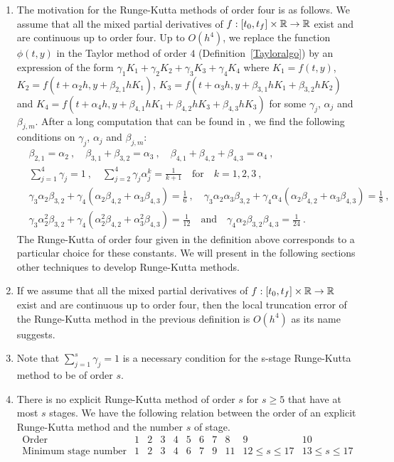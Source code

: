 \begin{rmkList}
\begin{enumerate}
\item The motivation for the Runge-Kutta methods of order four is as
follows.  We assume that all the mixed partial derivatives of
$f:[t_0,t_f]\times \mathbb{R} \rightarrow \mathbb{R}$ exist and are continuous up to
order four.  Up to $O(h^4)$, we replace the function $\phi(t,y)$ in the
Taylor method of order $4$ (Definition~\ref{Tayloralgo}) by an
expression of the form $\gamma_1 K_1 + \gamma_2 K_2 + \gamma_3 K_3 +
\gamma_4 K_4$ where
$K_1=f(t,y)$, $K_2=f(t+\alpha_2 h,y+\beta_{2,1} h K_1)$,
$K_3=f(t+\alpha_3 h,y+\beta_{3,1} h K_1 + \beta_{3,2} h K_2)$ and
$K_4=f(t+\alpha_4 h,y+\beta_{4,1} h K_1 + \beta_{4,2} h K_3 +
\beta_{4,3} h K_3)$ for some $\gamma_j$,
$\alpha_j$ and $\beta_{j,m}$.
After a long computation that can be found in \cite{La}, we find
the following conditions on $\gamma_j$, $\alpha_j$ and $\beta_{j,m}$:
\begin{align*}
& \beta_{2,1} = \alpha_2 \ , \quad
\beta_{3,1} + \beta_{3,2} = \alpha_3 \ , \quad
\beta_{4,1} + \beta_{4,2} + \beta_{4,3} = \alpha_4 \ ,\\
& \sum_{j=1}^4 \gamma_j = 1 \ , \quad
\sum_{j=2}^4 \gamma_j \alpha_j^k = \frac{1}{k+1} \quad \text{for}
\quad k =1,2,3 \ , \\
&\gamma_3 \alpha_2 \beta_{3,2} + \gamma_4 ( \alpha_2 \beta_{4,2} +
\alpha_3 \beta_{4,3}) = \frac{1}{6} \ , \quad
\gamma_3 \alpha_2 \alpha_3 \beta_{3,2} + \gamma_4 \alpha_4 ( \alpha_2
\beta_{4,2} + \alpha_3 \beta_{4,3}) = \frac{1}{8} \ ,\\
&\gamma_3 \alpha_2^2 \beta_{3,2} + \gamma_4 ( \alpha_2^2
\beta_{4,2} + \alpha_3^2 \beta_{4,3}) = \frac{1}{12}
\quad \text{and} \quad
\gamma_4 \alpha_2 \beta_{3,2} \beta_{4,3} = \frac{1}{24} \ .
\end{align*}
The Runge-Kutta of order four given in the definition above
corresponds to a particular choice for these constants.
We will present in the following sections other techniques to develop
Runge-Kutta methods.
\item If we assume that all the mixed partial derivatives of
$f:[t_0,t_f]\times \mathbb{R} \rightarrow \mathbb{R}$ exist and are continuous up to
order four, then the local truncation error of the Runge-Kutta method
in the previous definition is $O(h^4)$ as its name suggests.
\item Note that $\displaystyle \sum_{j=1}^s \gamma_j = 1$ is a
necessary condition for the s-stage Runge-Kutta method to be of
order $s$.
\item There is no explicit Runge-Kutta method of order $s$ for
$s\geq 5$ that have at most $s$ stages.  We have the following
relation between the order of an explicit Runge-Kutta method and the
number $s$ of stage.
\[
\begin{array}{l|cccccccccc}
\text{Order} & 1 & 2 & 3 & 4 & 5 & 6 & 7 & 8 & 9 & 10 \\
\hline
\text{Minimum stage number} & 1 & 2 & 3 & 4 & 6 & 7 & 9 & 11 &
12 \leq s \leq 17 & 13 \leq s \leq 17
\end{array}
\]
\end{enumerate}
\end{rmkList}

